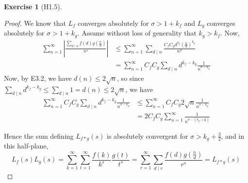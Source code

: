 \documentclass[reqno]{amsart}
\theoremstyle{definition}
\newtheorem{exercise}[theorem]{Exercise}
\theoremstyle{remark}
\begin{document}
    \begin{exercise}[H1.5]
        \begin{proof}
            We know that
            $L_f$ converges absolutely for
            $\sigma > 1 + k_f$ and
            $L_g$ converges absolutely for
            $\sigma > 1 + k_g$.
            Assume without loss of generality that
            $k_g > k_f$.
            Now,
            \begin{align*}
                \sum_{n=1}^{\infty }
                \left| \frac{\sum_{d  \mid n} f(d)
                g(\frac{n}{d})}{n^{s}}
                \right| 
                &\le \sum_{n=1}^{\infty} \sum_{d \mid n}
                \frac{C_f C_g d^{k_f} 
                \left( \frac{n}{d} \right)^{k_g}}{n^{\sigma}}\\
                &= \sum_{n=1}^{\infty} C_f C_g
                \sum_{d \mid n} d^{k_f - k_g} \frac{1}{n^{\sigma -
                k_g}}
            \end{align*}
            Now, by E3.2, we have
            $d(n) \le 2 \sqrt{n} $, so
            since
            $\sum_{d \mid n} d^{k_f -k_g}
            \le \sum_{d \mid n} 1 = 
            d(n) \le 2 \sqrt{n}$, we have
            \begin{align*}
                \sum_{n=1}^{\infty} C_f C_g
                \sum_{d \mid n} d^{k_f - k_g} \frac{1}{n^{\sigma -
                k_g}}
                &\le 
                \sum_{n=1}^{\infty} C_f C_g
                2\sqrt{n}  \frac{1}{n^{\sigma -
                k_g}}\\
                &= 2C_f C_g \sum_{n=1}^{\infty} 
                \frac{1}{n^{\sigma -\left( k_g + \frac{1}{2}
                \right) }}
            \end{align*}

            Hence the sum defining
             $L_{f*g}(s)$ is absolutely convergent
             for $\sigma > 
             k_g + \frac{3}{2}$,
             and in this half-plane, 
             \[
             L_f(s) L_g(s) = 
             \sum_{k=1}^{\infty} \sum_{t=1}^{\infty}
             \frac{f(k)}{k^{s}}
             \frac{g(t)}{t^{s}}
             = 
             \sum_{r=1}^{\infty} \sum_{d  \mid r} 
             \frac{f(d) g(\frac{n}{d})}{r^{s}}
             = L_{f*g}(s)
             \] 
        \end{proof}
    \end{exercise}
\end{document}
